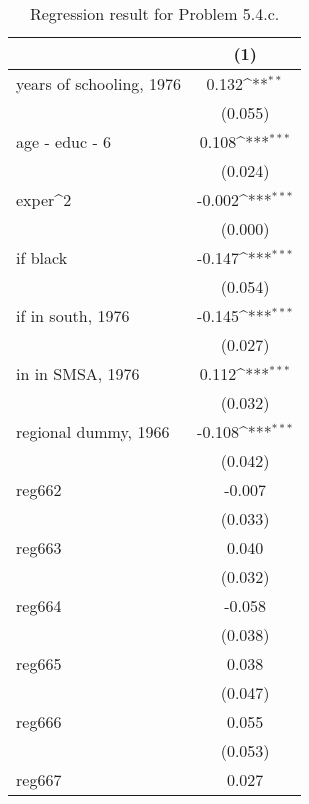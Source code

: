\begin{table}[htbp]\centering
\def\sym#1{\ifmmode^{#1}\else\(^{#1}\)\fi}
\caption{Regression result for Problem 5.4.c.}
\begin{tabular}{l*{1}{c}}
\toprule
                    &\multicolumn{1}{c}{(1)}         \\
\midrule
years of schooling, 1976&       0.132\sym{**} \\
                    &     (0.055)         \\
\addlinespace
age - educ - 6      &       0.108\sym{***}\\
                    &     (0.024)         \\
\addlinespace
exper^2             &      -0.002\sym{***}\\
                    &     (0.000)         \\
\addlinespace
=1 if black         &      -0.147\sym{***}\\
                    &     (0.054)         \\
\addlinespace
=1 if in south, 1976&      -0.145\sym{***}\\
                    &     (0.027)         \\
\addlinespace
=1 in in SMSA, 1976 &       0.112\sym{***}\\
                    &     (0.032)         \\
\addlinespace
regional dummy, 1966&      -0.108\sym{***}\\
                    &     (0.042)         \\
\addlinespace
reg662              &      -0.007         \\
                    &     (0.033)         \\
\addlinespace
reg663              &       0.040         \\
                    &     (0.032)         \\
\addlinespace
reg664              &      -0.058         \\
                    &     (0.038)         \\
\addlinespace
reg665              &       0.038         \\
                    &     (0.047)         \\
\addlinespace
reg666              &       0.055         \\
                    &     (0.053)         \\
\addlinespace
reg667              &       0.027         \\

\end{tabular}
\end{table}
